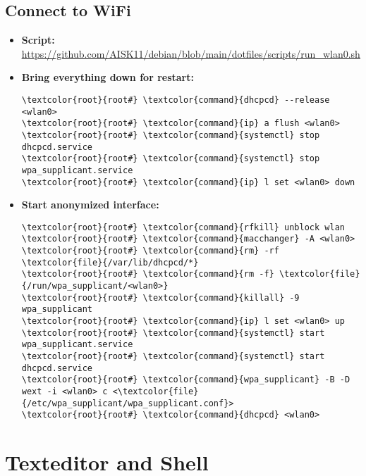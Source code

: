 \documentclass[10pt, a4paper, onecolumn, openany]{book} %
\begin{document}
\section{Connect to WiFi}
\begin{itemize}
    \item \textbf{Script:}
    \newline \underline{\url{https://github.com/AISK11/debian/blob/main/dotfiles/scripts/run_wlan0.sh}}
\end{itemize}
\begin{itemize}
    \item \textbf{Bring everything down for restart:}
\begin{Verbatim}[commandchars=\\\{\}]
\textcolor{root}{root#} \textcolor{command}{dhcpcd} --release <wlan0>
\textcolor{root}{root#} \textcolor{command}{ip} a flush <wlan0>
\textcolor{root}{root#} \textcolor{command}{systemctl} stop dhcpcd.service
\textcolor{root}{root#} \textcolor{command}{systemctl} stop wpa_supplicant.service
\textcolor{root}{root#} \textcolor{command}{ip} l set <wlan0> down
\end{Verbatim}
    \item \textbf{Start anonymized interface:}
\begin{Verbatim}[commandchars=\\\{\}]
\textcolor{root}{root#} \textcolor{command}{rfkill} unblock wlan
\textcolor{root}{root#} \textcolor{command}{macchanger} -A <wlan0>
\textcolor{root}{root#} \textcolor{command}{rm} -rf \textcolor{file}{/var/lib/dhcpcd/*}
\textcolor{root}{root#} \textcolor{command}{rm -f} \textcolor{file}{/run/wpa_supplicant/<wlan0>}
\textcolor{root}{root#} \textcolor{command}{killall} -9 wpa_supplicant
\textcolor{root}{root#} \textcolor{command}{ip} l set <wlan0> up
\textcolor{root}{root#} \textcolor{command}{systemctl} start wpa_supplicant.service
\textcolor{root}{root#} \textcolor{command}{systemctl} start dhcpcd.service
\textcolor{root}{root#} \textcolor{command}{wpa_supplicant} -B -D wext -i <wlan0> c <\textcolor{file}{/etc/wpa_supplicant/wpa_supplicant.conf}>
\textcolor{root}{root#} \textcolor{command}{dhcpcd} <wlan0>
\end{Verbatim}
\end{itemize}
\chapter{Texteditor and Shell}
\end{document}
